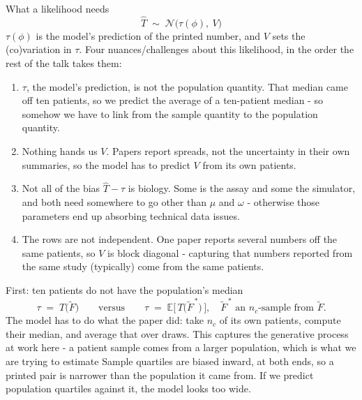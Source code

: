 \documentclass[10pt,aspectratio=169]{beamer}
\newcommand{\Ncal}{\mathcal{N}}
\begin{document}
\begin{frame}[t]{What a likelihood needs}
  \[ \widehat T \;\sim\; \Ncal\big(\tau(\phi),\ V\big) \]
  $\tau(\phi)$ is the model's prediction of the printed number, and $V$ sets the (co)variation in $\tau$.
  \vfill
  Four nuances/challenges about this likelihood, in the order the rest of the talk takes them:
  \begin{enumerate}\setlength\itemsep{4pt}\small
    \item $\tau$, the model's prediction, is not the population quantity. That
      median came off ten patients, so we predict the average of a ten-patient
      median - so somehow we have to link from the sample quantity to the population quantity.
    \item Nothing hands us $V$. Papers report spreads, not the uncertainty in
      their own summaries, so the model has to predict $V$ from its own
      patients.
    \item Not all of the bias $\widehat T - \tau$ is biology. Some is the assay and some
      the simulator, and both need somewhere to go other than $\mu$ and $\omega$ - otherwise those parameters end up absorbing technical data issues.
    \item The rows are not independent. One paper reports several numbers off
      the same patients, so $V$ is block diagonal - capturing that numbers reported from the same study (typically) come from the same patients.
  \end{enumerate}
\end{frame}

\begin{frame}[t]{First: ten patients do not have the population's median}
  \[
    \tau \;=\; T\big(\tilde F\big)
    \qquad\text{versus}\qquad
    \tau \;=\; \mathbb{E}\big[\,T\big(\tilde F^{\,\ast}\big)\,\big],
    \quad \tilde F^{\,\ast} \text{ an } n_c\text{-sample from } \tilde F .
  \]
  The model has to do what the paper did: take $n_c$ of its own patients,
  compute their median, and average that over draws. This captures the generative process at work here - a patient sample comes from a larger population, which is what we are trying to estimate
  \vfill
  Sample quartiles are biased inward, at both ends, so a printed pair is
  narrower than the population it came from. If we predict population quartiles
  against it, the model looks too wide.

\end{frame}
\end{document}
